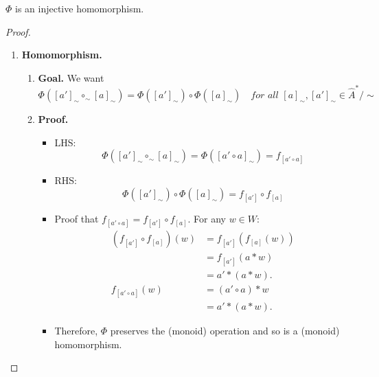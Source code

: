 \begin{proposition}
	$\Phi$ is an injective homomorphism. 
\end{proposition}
\begin{proof}
	\begin{enumerate}
		To prove that $\Phi$ is an injective homomorphism we need to show that $\Phi$ is injective and a homomorphism.
		\item \textbf{Homomorphism.}
		      \begin{enumerate}
			      \item \textbf{Goal.}
			            We want
			            \begin{equation}
				            \Phi([a']_\sim \circ_\sim [a]_\sim) = \Phi([a']_\sim) \circ \Phi([a]_\sim) \quad \textit{for all $[a]_\sim, [a']_\sim \in \hat{A}^{\ast} / \sim$}
			            \end{equation}
			      \item \textbf{Proof.}
			            \begin{itemize}
				            \item LHS:
				                  \begin{equation}
					                  \Phi([a']_\sim \circ_\sim [a]_\sim) = \Phi([a' \circ a]_\sim) = f_{[a' \circ a]}
				                  \end{equation}
				            \item RHS:
				                  \begin{equation}
					                  \Phi([a']_\sim) \circ \Phi([a]_\sim) = f_{[a']} \circ f_{[a]}
				                  \end{equation}
				            \item Proof that $f_{[a' \circ a]} = f_{[a']} \circ f_{[a]}$.
				                  For any $w \in W$:
				                  \begin{align}
					                  (f_{[a']} \circ f_{[a]})(w) & = f_{[a']}(f_{[a]}(w)) \\
					                                              & = f_{[a']}(a \ast w)   \\
					                                              & = a' \ast (a \ast w).  \\
					                  f_{[a' \circ a]}(w)         & = (a' \circ a) \ast w  \\
					                                              & = a' \ast (a \ast w).
				                  \end{align}
				            \item Therefore, $\Phi$ preserves the (monoid) operation and so is a (monoid) homomorphism.
			            \end{itemize}
		      \end{enumerate}


\end{enumerate}
\end{proof}
